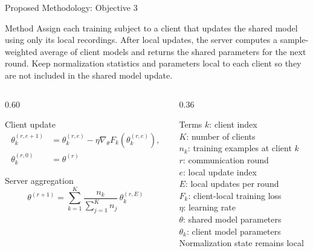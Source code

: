 \documentclass[10pt,aspectratio=169]{beamer}
\begin{document}
\begin{frame}[t]{Proposed Methodology: Objective 3}
\begin{block}{Method}
Assign each training subject to a client that updates the shared model using only its local recordings. After local updates, the server computes a sample-weighted average of client models and returns the shared parameters for the next round. Keep normalization statistics and parameters local to each client so they are not included in the shared model update.
\end{block}
\vspace{-1pt}
\begin{columns}[T,onlytextwidth]
\begin{column}{0.60\textwidth}
\begin{block}{Client update}
\footnotesize
\[
\begin{aligned}
\theta_{k}^{(r,e+1)}&=\theta_{k}^{(r,e)}
-\eta\nabla_{\theta}F_k\!\left(\theta_{k}^{(r,e)}\right),\\
\theta_k^{(r,0)}&=\theta^{(r)}
\end{aligned}
\]
\end{block}
\begin{block}{Server aggregation}
\footnotesize
\[
\theta^{(r+1)}=
\sum_{k=1}^{K}\frac{n_k}{\sum_{j=1}^{K}n_j}\,
\theta_k^{(r,E)}
\]
\end{block}
\end{column}
\begin{column}{0.36\textwidth}
\begin{block}{Terms}
\footnotesize
$k$: client index\\
$K$: number of clients\\
$n_k$: training examples at client $k$\\
$r$: communication round\\
$e$: local update index\\
$E$: local updates per round\\
$F_k$: client-local training loss\\
$\eta$: learning rate\\
$\theta$: shared model parameters\\
$\theta_k$: client model parameters\\
Normalization state remains local
\end{block}
\end{column}
\end{columns}
\end{frame}
\end{document}
